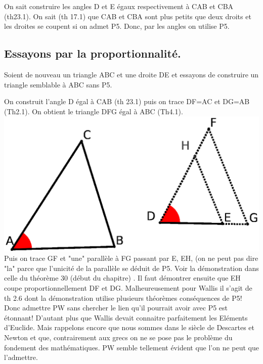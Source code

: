 \documentclass[a4paper, 12pt, twoside]{book}
\begin{document}
On sait construire les angles D et E égaux respectivement à CAB et CBA (th23.1). On sait (th 17.1) que CAB et CBA sont plus petits que deux droits et les droites se coupent si on admet P5. Donc, par les angles on utilise P5.\\

\subsection{Essayons par la proportionnalité.}
 

 Soient de nouveau un triangle ABC et une droite DE et essayons de construire un triangle semblable à ABC sans P5.\

On construit l'angle D égal à CAB (th 23.1) puis on trace  DF=AC et DG=AB (Th2.1). On obtient le triangle DFG égal à ABC (Th4.1).\\


 \includegraphics[scale=0.7]{figures/WALLIS2.eps} \\
 
 
 
 
  Puis on trace GF et "une" parallèle à FG passant par E, EH, (on ne peut pas dire "la" parce que l'unicité de la parallèle se déduit de P5. Voir la démonstration dans celle du théorème 30 (début du chapitre) . Il faut démontrer ensuite que EH coupe proportionnellement DF et DG. Malheureusement pour Wallis il s'agit de th 2.6 dont la démonstration utilise plusieurs théorèmes conséquences de P5!\\
  
  
  
  Donc admettre PW sans chercher le lien qu'il pourrait avoir avec P5 est étonnant!  D'autant plus que Wallis devait connaitre parfaitement les Eléments d'Euclide. Mais rappelons encore que nous sommes dans le siècle de Descartes et Newton et que, contrairement aux grecs on ne se pose pas le problème du fondement des mathématiques. PW semble tellement évident que l'on ne peut que l'admettre.\\
 
\end{document}

